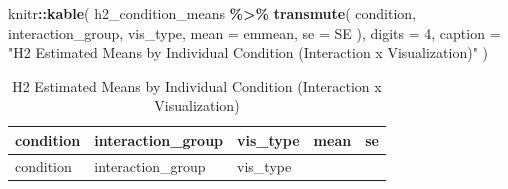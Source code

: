 \documentclass[
]{article}
\newenvironment{Shaded}{\begin{snugshade}}{\end{snugshade}}
\newcommand{\AttributeTok}[1]{\textcolor[rgb]{0.13,0.29,0.53}{#1}}
\newcommand{\DecValTok}[1]{\textcolor[rgb]{0.00,0.00,0.81}{#1}}
\newcommand{\FunctionTok}[1]{\textcolor[rgb]{0.13,0.29,0.53}{\textbf{#1}}}
\newcommand{\NormalTok}[1]{#1}
\newcommand{\SpecialCharTok}[1]{\textcolor[rgb]{0.81,0.36,0.00}{\textbf{#1}}}
\newcommand{\StringTok}[1]{\textcolor[rgb]{0.31,0.60,0.02}{#1}}
\begin{document}
\begin{Shaded}
\begin{Highlighting}[]
\NormalTok{knitr}\SpecialCharTok{::}\FunctionTok{kable}\NormalTok{(}
\NormalTok{  h2\_condition\_means }\SpecialCharTok{\%\textgreater{}\%}
    \FunctionTok{transmute}\NormalTok{(}
\NormalTok{      condition,}
\NormalTok{      interaction\_group,}
\NormalTok{      vis\_type,}
      \AttributeTok{mean =}\NormalTok{ emmean,}
      \AttributeTok{se =}\NormalTok{ SE}
\NormalTok{    ),}
  \AttributeTok{digits =} \DecValTok{4}\NormalTok{,}
  \AttributeTok{caption =} \StringTok{"H2 Estimated Means by Individual Condition (Interaction x Visualization)"}
\NormalTok{)}
\end{Highlighting}
\end{Shaded}

\begin{longtable}[]{@{}
  >{\raggedright\arraybackslash}p{}
  >{\raggedright\arraybackslash}p{}
  >{\raggedright\arraybackslash}p{}
  >{\raggedleft\arraybackslash}p{}
  >{\raggedleft\arraybackslash}p{}@{}}
\caption{H2 Estimated Means by Individual Condition (Interaction x
Visualization)}\tabularnewline
\toprule\noalign{}
\begin{minipage}[b]{\linewidth}\raggedright
condition
\end{minipage} & \begin{minipage}[b]{\linewidth}\raggedright
interaction\_group
\end{minipage} & \begin{minipage}[b]{\linewidth}\raggedright
vis\_type
\end{minipage} & \begin{minipage}[b]{\linewidth}\raggedleft
mean
\end{minipage} & \begin{minipage}[b]{\linewidth}\raggedleft
se
\end{minipage} \\
\midrule\noalign{}
\endfirsthead
\toprule\noalign{}
\begin{minipage}[b]{\linewidth}\raggedright
condition
\end{minipage} & \begin{minipage}[b]{\linewidth}\raggedright
interaction\_group
\end{minipage} & \begin{minipage}[b]{\linewidth}\raggedright
vis\_type
\end{minipage} & \begin{minipage}[b]{\linewidth}\raggedleft

\end{minipage}
\end{longtable}
\end{document}
